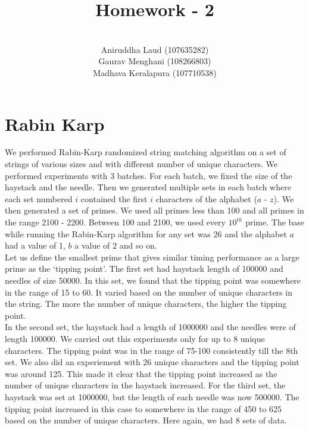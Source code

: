 \documentclass{article}
\title{Homework - 2}
\author{\\
        Aniruddha Laud (107635282)\\
        Gaurav Menghani (108266803)\\
        Madhava Keralapura (107710538)\\}
\begin{document}
\maketitle

\clearpage

\tableofcontents

\clearpage

\section{Rabin Karp}
We performed Rabin-Karp randomized string matching algorithm on a set of strings of various sizes and with different number of unique characters. We performed experiments with 3 batches. For each batch, we fixed the size of the haystack and the needle. Then we generated multiple sets in each batch where each set numbered $i$ contained the first $i$ characters of the alphabet ($a$ - $z$). We then generated a set of primes. We used all primes less than 100 and all primes in the range 2100 - 2200. Between 100 and 2100, we used every $10^{th}$ prime. The base while running the Rabin-Karp algorithm for any set was 26 and the alphabet $a$ had a value of 1, $b$ a value of 2 and so on. \\

Let us define the smallest prime that gives similar timing performance as a large prime as the `tipping point'.
The first set had haystack length of 100000 and needles of size 50000. In this set, we found that the tipping point was somewhere in the range of 15 to 60. It varied based on the number of unique characters in the string. The more the number of unique characters, the higher the tipping point. \\

In the second set, the haystack had a length of 1000000 and the needles were of length 100000. We carried out this experiments only for up to 8 unique characters. The tipping point was in the range of 75-100 consistently till the 8th set. We also did an experiement with 26 unique characters and the tipping point was around 125. This made it clear that the tipping point increased as the number of unique characters in the haystack increased. 
For the third set, the haystack was set at 1000000, but the length of each needle was now 500000. The tipping point increased in this case to somewhere in the range of 450 to 625 based on the number of unique characters. Here again, we had 8 sets of data. \\
\end{document}
